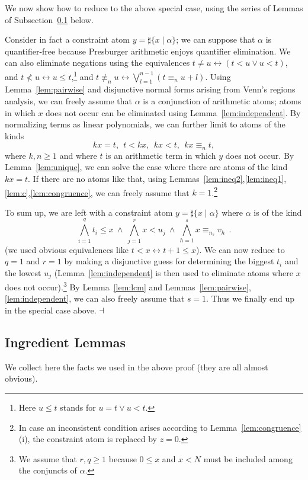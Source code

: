 \documentclass[11pt,a4paper]{article}
\begin{document}
{We now show how to reduce to the above special case, using the series of Lemmas of Subsection~\ref{subsec:lemmmas} below.

Consider in fact a constraint atom $y=\sharp\{ x\mid \alpha\}$; we can suppose that $\alpha$ is quantifier-free because Presburger arithmetic enjoys quantifier elimination. We can also eliminate negations using the equivalences  $t\neq u\leftrightarrow (t<u\vee u<t)$, and $t\not < u\leftrightarrow u\leq t$,\footnote{
Here $u\leq t$ stands for $u=t\vee u<t$.} 
and $t\not\equiv_n u\leftrightarrow \bigvee_{l=1}^{n-1} (t\equiv_n u+l)$.
Using Lemma~\ref{lem:pairwise} and  disjunctive normal forms arising from Venn's regions analysis, we can freely assume that $\alpha$ is a conjunction
of arithmetic atoms; atoms in which $x$ does not occur can be eliminated using Lemma~\ref{lem:independent}.
By normalizing terms as linear polynomials, we can further limit to atoms of the kinds
$$
kx=t, ~~t< kx,~~ kx<t,  ~~kx\equiv_n t,
$$
where  $k,n \geq 1$ and where $t$ is an arithmetic term in which $y$ does not occur. 
By Lemma~\ref{lem:unique}, we can solve the case where there are atoms of the kind $kx=t$. If there are no atoms like that,
using Lemmas~\ref{lem:ineq2},\ref{lem:ineq1},\ref{lem:c},\ref{lem:congruence}, we can freely assume that $k=1$.\footnote{ In case an inconsistent condition
arises according to Lemma~\ref{lem:congruence}(i), the constraint atom is replaced by $z=0$.}


To sum up, we are left with a constraint atom $y=\sharp\{ x\mid \alpha\}$ where $\alpha$ is of the kind
$$
\bigwedge_{i=1}^q t_i \leq x ~\wedge~\bigwedge_{j=1}^r x<u_j~ \wedge ~\bigwedge_{h=1}^s x\equiv_{n_s}v_h~~.
$$
(we  used  obvious equivalences like $t<x \leftrightarrow t+1\leq x$).
We can now reduce to $q=1$ and $r=1$ by making a disjunctive guess for determining the biggest $t_i$ and the lowest $u_j$ 
(Lemma~\ref{lem:independent} is then used to eliminate atoms where $x$ does not occur).\footnote{We  assume that $r,q\geq 1$
because $0\leq x$ and $x<N$ must be included among the conjuncts of $\alpha$.}
By Lemma~\ref{lem:lcm} and Lemmas~\ref{lem:pairwise},\ref{lem:independent}, we can also freely assume that $s=1$. Thus we finally end up in the special case above.
 $\hfill\dashv$


\subsection{Ingredient Lemmas}\label{subsec:lemmmas}

We collect here the facts we used  in the above proof (they are all almost obvious).

}
\end{document}
